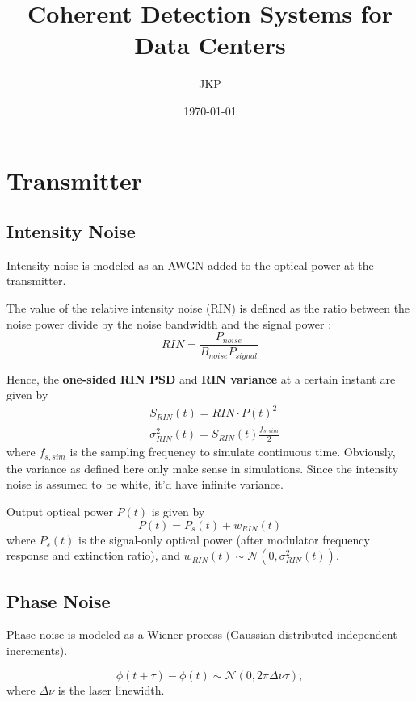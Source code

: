 \documentclass[a4paper]{article}
\title{Coherent Detection Systems for Data Centers}
\author{JKP}
\date{\today}
\begin{document}
\maketitle

\section{Transmitter}
\subsection{Intensity Noise}
Intensity noise is modeled as an AWGN added to the optical power at the transmitter.

The value of the relative intensity noise (RIN) is defined as the ratio between the noise power divide by the noise bandwidth and the signal power \cite{agilent-RIN-measurement}: 
\begin{equation}
RIN = \frac{P_{noise}}{B_{noise}P_{signal}}
\end{equation}

Hence, the \textbf{one-sided RIN PSD} and \textbf{RIN variance} at a certain instant are given by
\begin{align}
& S_{RIN}(t) = RIN\cdot P(t)^2 \\
& \sigma^2_{RIN}(t) = S_{RIN}(t)\frac{f_{s, sim}}{2}
\end{align}
where $f_{s, sim}$ is the sampling frequency to simulate continuous time. Obviously, the variance as defined here only make sense in simulations. Since the intensity noise is assumed to be white, it'd have infinite variance.

Output optical power $P(t)$ is given by
\begin{equation}
P(t) = P_s(t) + w_{RIN}(t)
\end{equation}
where $P_s(t)$ is the signal-only optical power (after modulator frequency response and extinction ratio), and $w_{RIN}(t)\sim\mathcal{N}(0, \sigma^2_{RIN}(t))$.

\subsection{Phase Noise}
Phase noise is modeled as a Wiener process (Gaussian-distributed independent increments).

\begin{equation}
\phi(t+\tau) - \phi(t) \sim\mathcal{N}(0, 2\pi\Delta\nu\tau),
\end{equation} 
where $\Delta\nu$ is the laser linewidth. 
\end{document}
